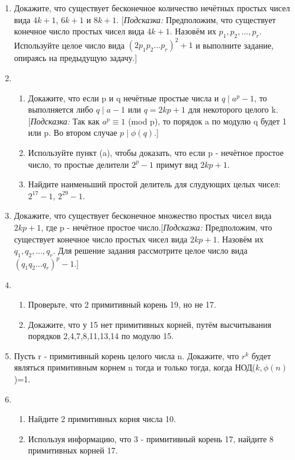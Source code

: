 \documentclass[twoside,12pt]{article}
\begin{document}
{\begin{enumerate}[label=\textbf{\arabic*.}]
\begin{enumerate}
         \item Нечётные простые делители целого числа $n^{2}+n+1$, отличные от 3 имеют вид $6k+1$.	\end{enumerate}
     \item Докажите, что существует бесконечное количество нечётных простых чисел вида $4k+1$, $6k+1$ и $8k+1$. [\textit{Подсказка:} Предположим, что существует конечное число простых чисел вида $4k+1$. Назовём их $p_{1},p_{2},...,p_{r}$. Используйте целое число вида $(2p_{1}p_{2}...p_{r})^{2}+1$ и выполните задание, опираясь на предыдущую задачу.]
     \item \begin{enumerate} \item Докажите, что если p и q нечётные простые числа и $q\mid a^{p}-1$, то выполняется либо $q\mid a-1$ или $q=2kp+1$ для некоторого целого k. [\textit{Подсказка:} Так как $a^{p}\equiv1$ (mod p), то порядок a по модулю q будет 1 или p. Во втором случае $p\mid\phi(q)$.]
                              \item Используйте пункт (a), чтобы доказать, что если p - нечётное простое число, то простые делители $2^{p}-1$ примут вид $2kp+1$.
                              \item Найдите наименьший простой делитель для слудующих целых чисел: $2^{17}-1$, $2^{29}-1$.
                              \end{enumerate}
      \item Докажите, что существует бесконечное множество простых чисел вида $2kp+1$, где p - нечётное простое число.[\textit{Подсказка:} Предположим, что существует конечное число простых чисел вида $2kp+1$. Назовём их $q_{1},q_{2},...,q_{r}$. Для решение задания рассмотрите целое число вида $(q_{1}q_{2}...q_{r})^{p}-1$.]     
      \item  \begin{enumerate} \item Проверьте, что 2 примитивный корень 19, но не 17.
      	                       \item Докажите, что у 15 нет примитивных корней, путём высчитывания порядков 2,4,7,8,11,13,14 по модулю 15. \end{enumerate}    
      \item Пусть r - примитивный корень целого числа n. Докажите, что $r^{k}$ будет являться примитивным корнем n тогда и только тогда, когда НОД($k,\phi(n)$)=1.
      \item  \begin{enumerate} \item Найдите 2 примитивных корня числа 10.
                               \item Используя информацию, что 3 - примитивный корень 17, найдите 8 примитивных корней 17.\end{enumerate}
      
	

\end{enumerate}
}\newpage
\end{document}
